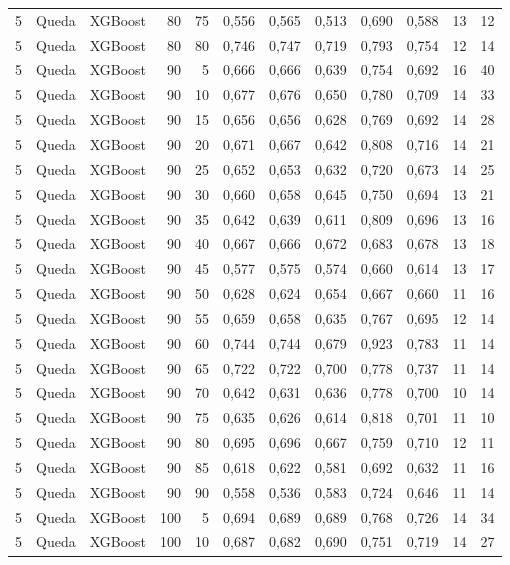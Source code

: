 \begin{longtable}{@{}rllrrrrrrrrr@{}}
5 & Queda & XGBoost & 80 & 75 & 0,556 & 0,565 & 0,513 & 0,690 & 0,588 & 13 & 12 \\
5 & Queda & XGBoost & 80 & 80 & 0,746 & 0,747 & 0,719 & 0,793 & 0,754 & 12 & 14 \\
5 & Queda & XGBoost & 90 & 5 & 0,666 & 0,666 & 0,639 & 0,754 & 0,692 & 16 & 40 \\
5 & Queda & XGBoost & 90 & 10 & 0,677 & 0,676 & 0,650 & 0,780 & 0,709 & 14 & 33 \\
5 & Queda & XGBoost & 90 & 15 & 0,656 & 0,656 & 0,628 & 0,769 & 0,692 & 14 & 28 \\
5 & Queda & XGBoost & 90 & 20 & 0,671 & 0,667 & 0,642 & 0,808 & 0,716 & 14 & 21 \\
5 & Queda & XGBoost & 90 & 25 & 0,652 & 0,653 & 0,632 & 0,720 & 0,673 & 14 & 25 \\
5 & Queda & XGBoost & 90 & 30 & 0,660 & 0,658 & 0,645 & 0,750 & 0,694 & 13 & 21 \\
5 & Queda & XGBoost & 90 & 35 & 0,642 & 0,639 & 0,611 & 0,809 & 0,696 & 13 & 16 \\
5 & Queda & XGBoost & 90 & 40 & 0,667 & 0,666 & 0,672 & 0,683 & 0,678 & 13 & 18 \\
5 & Queda & XGBoost & 90 & 45 & 0,577 & 0,575 & 0,574 & 0,660 & 0,614 & 13 & 17 \\
5 & Queda & XGBoost & 90 & 50 & 0,628 & 0,624 & 0,654 & 0,667 & 0,660 & 11 & 16 \\
5 & Queda & XGBoost & 90 & 55 & 0,659 & 0,658 & 0,635 & 0,767 & 0,695 & 12 & 14 \\
5 & Queda & XGBoost & 90 & 60 & 0,744 & 0,744 & 0,679 & 0,923 & 0,783 & 11 & 14 \\
5 & Queda & XGBoost & 90 & 65 & 0,722 & 0,722 & 0,700 & 0,778 & 0,737 & 11 & 14 \\
5 & Queda & XGBoost & 90 & 70 & 0,642 & 0,631 & 0,636 & 0,778 & 0,700 & 10 & 14 \\
5 & Queda & XGBoost & 90 & 75 & 0,635 & 0,626 & 0,614 & 0,818 & 0,701 & 11 & 10 \\
5 & Queda & XGBoost & 90 & 80 & 0,695 & 0,696 & 0,667 & 0,759 & 0,710 & 12 & 11 \\
5 & Queda & XGBoost & 90 & 85 & 0,618 & 0,622 & 0,581 & 0,692 & 0,632 & 11 & 16 \\
5 & Queda & XGBoost & 90 & 90 & 0,558 & 0,536 & 0,583 & 0,724 & 0,646 & 11 & 14 \\
5 & Queda & XGBoost & 100 & 5 & 0,694 & 0,689 & 0,689 & 0,768 & 0,726 & 14 & 34 \\
5 & Queda & XGBoost & 100 & 10 & 0,687 & 0,682 & 0,690 & 0,751 & 0,719 & 14 & 27 \\

\end{longtable}
